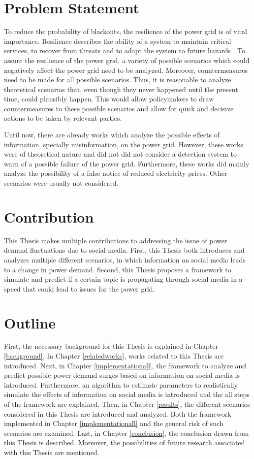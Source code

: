 \section{Problem Statement}
\label{problemstatement}

To reduce the probability of blackouts, 
the resilience of the power grid is of vital importance.
Resilience describes the ability of a system 
to maintain critical services, to recover from threats
and to adapt the system to future hazards 
\cite{wells2022modeling}.
To assure the resilience of the power grid, a variety of possible 
scenarios which could negatively affect the power grid need
to be analyzed. Moreover, countermeasures need to be made for all possible scenarios.
Thus, it is reasonable to analyze theoretical scenarios that, even though
they never happened until the present time, could plausibly happen. This 
would allow policymakers to draw countermeasures to these possible scenarios
and allow for quick and decisive actions to be taken by relevant 
parties.

Until now, there are already works which analyze the possible effects
of information, specially misinformation, on the power
grid. However, these works were of theoretical nature and did not 
did not consider a detection system to warn of a possible 
failure of the power grid. Furthermore, these works did mainly analyze the 
possibility of a false notice of reduced electricity prices.
Other scenarios were usually not considered.

\section{Contribution}
\label{contribution}
This Thesis makes multiple contributions to addressing the issue of 
power demand fluctuations due to social media.
First, this Thesis both introduces and 
analyzes multiple different scenarios, in which
information on social media leads to a change in power demand.
Second, this Thesis proposes a framework to simulate and predict if 
a certain topic is propagating through social media
in a speed that could lead to issues for the power grid.

\section{Outline}
\label{outline}

First, the necessary background for this Thesis is explained
in Chapter \ref{background}. 
In Chapter \ref{relatedworks}, works related to 
this Thesis are introduced.
Next, in Chapter \ref{implementationall}, the framework to
analyze and predict possible power demand surges based on
information on social media is introduced. Furthermore,
an algorithm to estimate parameters to realistically simulate
the effects of information on social media is introduced and 
the all steps of the framework are explained.
Then, in Chapter \ref{results}, the different scenarios 
considered in this Thesis are introduced and analyzed. Both the 
framework implemented in Chapter \ref{implementationall}
and the general risk of such scenarios are 
examined.
Last, in Chapter \ref{conclusion}, the conclusion drawn 
from this Thesis is described. Moreover, the possibilities
of future research associated with this Thesis 
are mentioned.